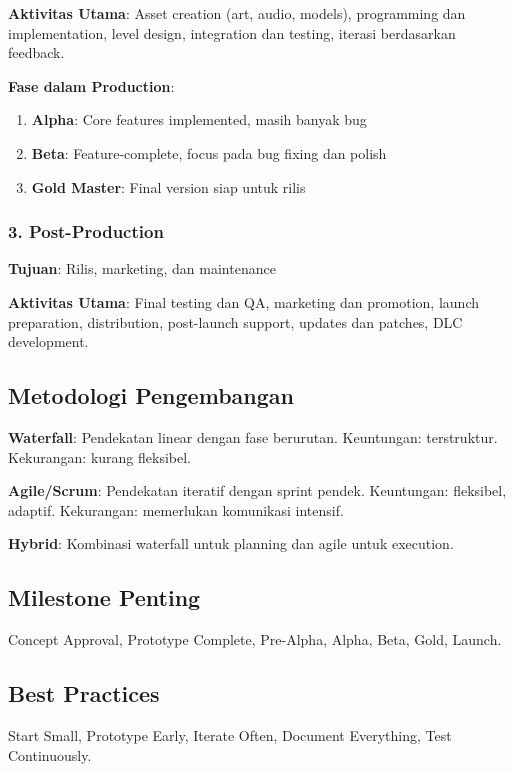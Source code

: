 \textbf{Aktivitas Utama}: Asset creation (art, audio, models), programming dan implementation, level design, integration dan testing, iterasi berdasarkan feedback.

\textbf{Fase dalam Production}:
\begin{enumerate}
\item \textbf{Alpha}: Core features implemented, masih banyak bug
\item \textbf{Beta}: Feature-complete, focus pada bug fixing dan polish
\item \textbf{Gold Master}: Final version siap untuk rilis
\end{enumerate}

\subsubsection{3. Post-Production}

\textbf{Tujuan}: Rilis, marketing, dan maintenance

\textbf{Aktivitas Utama}: Final testing dan QA, marketing dan promotion, launch preparation, distribution, post-launch support, updates dan patches, DLC development.

\subsection{Metodologi Pengembangan}

\textbf{Waterfall}: Pendekatan linear dengan fase berurutan. Keuntungan: terstruktur. Kekurangan: kurang fleksibel.

\textbf{Agile/Scrum}: Pendekatan iteratif dengan sprint pendek. Keuntungan: fleksibel, adaptif. Kekurangan: memerlukan komunikasi intensif.

\textbf{Hybrid}: Kombinasi waterfall untuk planning dan agile untuk execution.

\subsection{Milestone Penting}

Concept Approval, Prototype Complete, Pre-Alpha, Alpha, Beta, Gold, Launch.

\subsection{Best Practices}

Start Small, Prototype Early, Iterate Often, Document Everything, Test Continuously.
